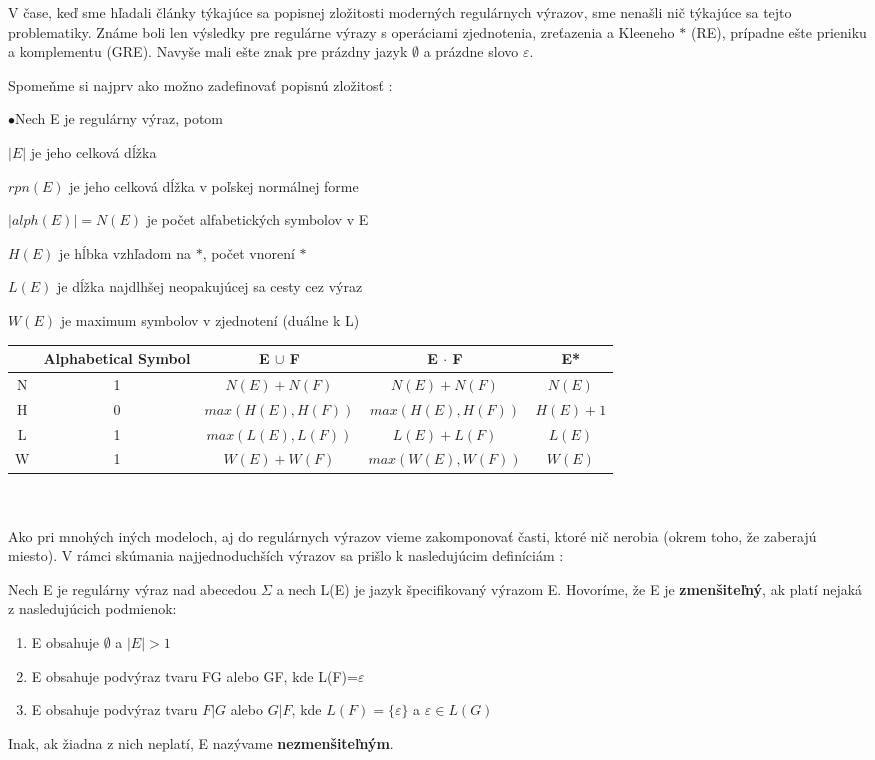 V čase, keď sme hľadali články týkajúce sa popisnej zložitosti moderných regulárnych výrazov, sme nenašli nič týkajúce sa tejto problematiky. Známe boli len výsledky pre regulárne výrazy s operáciami zjednotenia, zreťazenia a Kleeneho $*$ (RE), prípadne ešte prieniku a komplementu (GRE). Navyše mali ešte znak pre prázdny jazyk $\emptyset$ a prázdne slovo $\varepsilon$.

Spomeňme si najprv ako možno zadefinovať popisnú zložitosť \cite{newResults} \cite{compMeasures75}:

\begin{list}{$\bullet$}{Nech E je regulárny výraz, potom}
\item $|E|$ je jeho celková dĺžka
\item $rpn(E)$ je jeho celková dĺžka v poľskej normálnej forme
\item $|alph(E)|= N(E)$ je počet alfabetických symbolov v E
\item $H(E)$ je hĺbka vzhľadom na $*$, počet vnorení $*$
\item $L(E)$ je dĺžka najdlhšej neopakujúcej sa cesty cez výraz
\item $W(E)$ je maximum symbolov v zjednotení (duálne k L)
\end{list}

\begin{tabular}{|c||c|c|c|c|}
\hline
 ~ & Alphabetical Symbol & E $\cup$ F & E $\cdot$ F & E*
\\ \hline\hline
N & 1 & $N(E)+N(F)$ & $N(E)+N(F)$ & $N(E)$
\\ \hline 
H & 0 & $max(H(E),H(F))$ & $max(H(E),H(F))$ & $H(E)+1$
\\ \hline
L & 1 & $max(L(E),L(F))$ & $L(E)+L(F)$ & $L(E)$
\\ \hline
W & 1 & $W(E)+W(F)$ & $max(W(E),W(F))$ & $W(E)$
\\ \hline
\end{tabular}
\\ \\

Ako pri mnohých iných modeloch, aj do regulárnych výrazov vieme zakomponovať časti, ktoré nič nerobia (okrem toho, že zaberajú miesto). V rámci skúmania najjednoduchších výrazov sa prišlo k nasledujúcim definíciám \cite{newResults}:

\begin{df}
Nech E je regulárny výraz nad abecedou $\Sigma$ a nech L(E) je jazyk špecifikovaný výrazom E. Hovoríme, že E je \textbf{zmenšiteľný}, ak platí nejaká z nasledujúcich podmienok:
\begin{enumerate}
\item E obsahuje $\emptyset$ a $|E|>1$
\item E obsahuje podvýraz tvaru FG alebo GF, kde L(F)={$\varepsilon$}
\item E obsahuje podvýraz tvaru $F|G$ alebo $G|F$, kde $L(F)=\lbrace \varepsilon \rbrace$ a $\varepsilon \in L(G)$
\end{enumerate}
Inak, ak žiadna z nich neplatí, E nazývame \textbf{nezmenšiteľným}.
\end{df}

